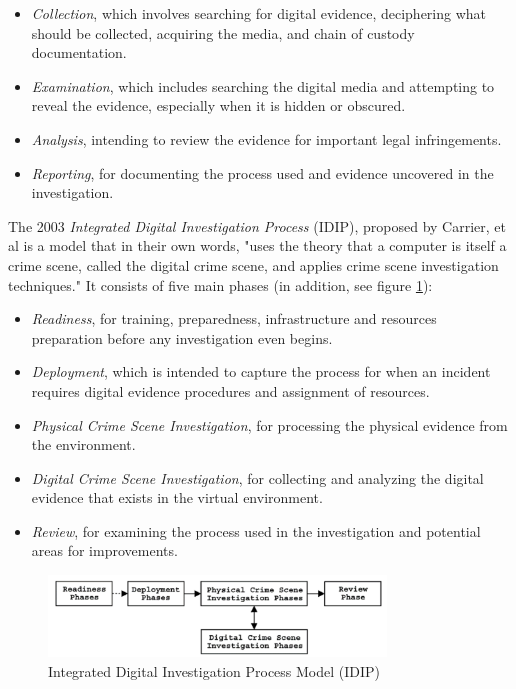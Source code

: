 \documentclass[12pt]{article}
\begin{document}
\begin{itemize}
  \item {\em Collection}, which involves searching for digital evidence,
  deciphering what should be collected, acquiring the media,
  and chain of custody documentation.
  \item {\em Examination}, which includes searching the digital media
  and attempting to reveal the evidence, especially when it is
  hidden or obscured.
  \item {\em Analysis}, intending to review the evidence for important
  legal infringements. 
  \item {\em Reporting}, for documenting the process used and evidence
  uncovered in the investigation.
\end{itemize}

The 2003 {\em Integrated Digital Investigation Process} (IDIP)\cite{carrier2003getting},
proposed by Carrier, et al is a model that in their own words, "uses the theory
that a computer is itself a crime scene, called the digital crime scene, and applies crime scene
investigation techniques."  It consists of five main phases (in addition, see figure \ref{fig:IDIP}):

\begin{itemize}
  \item {\em Readiness}, for training, preparedness, infrastructure and resources
  preparation before any investigation even begins.
  \item {\em Deployment}, which is intended to capture the process for when an 
  incident requires digital evidence procedures and assignment of resources.
  \item {\em Physical Crime Scene Investigation}, for processing the physical
  evidence from the environment.
  \item {\em Digital Crime Scene Investigation}, for collecting and
  analyzing the digital evidence that exists in the virtual environment.
  \item {\em Review}, for examining the process used in the investigation and
  potential areas for improvements. 
\end{itemize}

\begin{figure}[ht]
  \centering
    \includegraphics[width=0.8\textwidth]{images/IDIP.png}
  \caption{Integrated Digital Investigation Process Model (IDIP)}
  \label{fig:IDIP}
\end{figure}
\end{document}
